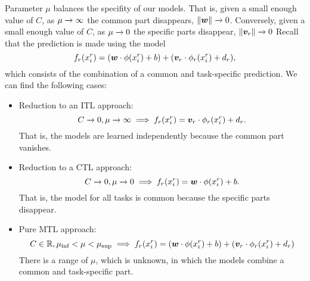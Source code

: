 %
Parameter $\mu$ balances the specifity of our models. That is, given a small enough value of $C$, as $\mu \xrightarrow[]{} \infty $ the common part disappears, $\left\lVert\bm{w}\right\rVert \xrightarrow[]{} 0$. Conversely, given a small enough value of $C$, as $\mu \xrightarrow[]{} 0$ the specific parts disappear, $\left\lVert\bm{v}_r\right\rVert \xrightarrow[]{} 0$
%
Recall that the prediction is made using the model $$ f_r(x_i^r) =(\bm{w} \cdot \phi(x_{i}^r) + b) + (\bm{v}_r \cdot \phi_r(x_{i}^r) + d_r),$$
which consists of the combination of a common and task-specific prediction.
We can find the following cases:
\begin{itemize}
    \item Reduction to an ITL approach:
    $$C \xrightarrow[]{} 0, \mu \xrightarrow[]{} \infty \implies f_r(x_i^r) = \bm{v}_r \cdot \phi_r(x_{i}^r) + d_r .$$
    That is, the models are learned independently because the common part vanishes.
    \item Reduction to a CTL approach: 
    $$C \xrightarrow[]{} 0, \mu \xrightarrow[]{} 0 \implies f_r(x_i^r) = \bm{w} \cdot \phi(x_{i}^r) + b .$$
    That is, the model for all tasks is common because the specific parts disappear.
    \item Pure MTL approach:
    $$ C \in \mathbb{R}, \mu_\text{inf} < \mu < \mu_\text{sup} \implies f_r(x_i^r) =(\bm{w} \cdot \phi(x_{i}^r) + b) + (\bm{v}_r \cdot \phi_r(x_{i}^r) + d_r) $$
    There is a range of $\mu$, which is unknown, in which the models combine a common and task-specific part.
\end{itemize}

